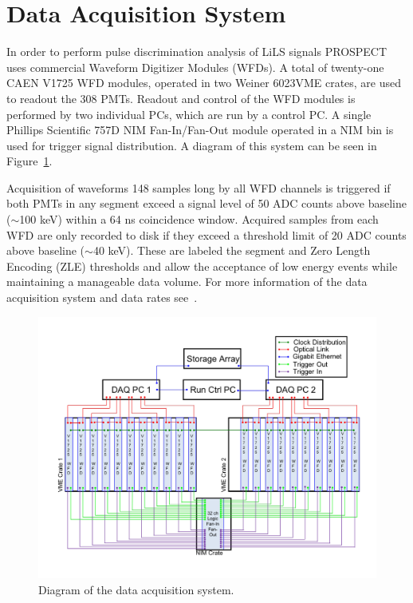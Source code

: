 \section{Data Acquisition System} \label{sec:DAQ}

In order to perform pulse discrimination analysis of LiLS signals PROSPECT uses commercial Waveform Digitizer Modules (WFDs).
A total of twenty-one CAEN V1725 WFD modules, operated in two Weiner 6023VME crates, are used to readout the 308 PMTs. 
Readout and control of the WFD modules is performed by two individual PCs, which are run by a control PC. 
A single Phillips Scientific 757D NIM Fan-In/Fan-Out module operated in a NIM bin is used for trigger signal distribution.
A diagram of this system can be seen in Figure~\ref{fig:daq}.

Acquisition of waveforms 148 samples long by all WFD channels is triggered if both PMTs in any segment exceed a signal level of 50 ADC counts above baseline ($\sim$100 keV) within a 64 ns coincidence window.  
Acquired samples from each WFD are only recorded to disk if they exceed a threshold limit of 20 ADC counts above baseline ($\sim$40 keV). 
These are labeled the segment and Zero Length Encoding (ZLE) thresholds and allow the acceptance of low energy events while maintaining a manageable data volume. 
For more information of the data acquisition system and data rates see~\cite{LongNIM}.

\begin{figure}[h]
	\centering
	\includegraphics[width=0.7\linewidth]{tex/4-prospect-images/DAQ}
	\caption[DAQ schematic]{Diagram of the data acquisition system.}
	\label{fig:daq}
\end{figure}


